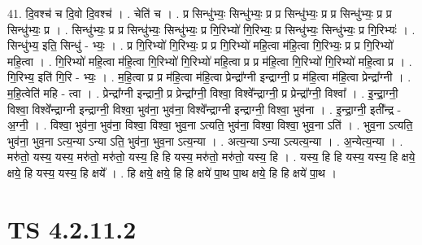 \documentclass[17pt]{extarticle}
\begin{document}
41. दि॒वश्च॑ च दि॒वो दि॒वश्च॑ । . चेति॑ च । . प्र सिन्धु॑भ्यः॒ सिन्धु॑भ्यः॒ प्र प्र सिन्धु॑भ्यः॒ प्र प्र सिन्धु॑भ्यः॒ प्र प्र सिन्धु॑भ्यः॒ प्र । . सिन्धु॑भ्यः॒ प्र प्र सिन्धु॑भ्यः॒ सिन्धु॑भ्यः॒ प्र गि॒रिभ्यो॑ गि॒रिभ्यः॒ प्र सिन्धु॑भ्यः॒ सिन्धु॑भ्यः॒ प्र गि॒रिभ्यः॑ । . सिन्धु॑भ्य॒ इति॒ सिन्धु॑ - भ्यः॒ । . प्र गि॒रिभ्यो॑ गि॒रिभ्यः॒ प्र प्र गि॒रिभ्यो॑ महि॒त्वा म॑हि॒त्वा गि॒रिभ्यः॒ प्र प्र गि॒रिभ्यो॑ महि॒त्वा । . गि॒रिभ्यो॑ महि॒त्वा म॑हि॒त्वा गि॒रिभ्यो॑ गि॒रिभ्यो॑ महि॒त्वा प्र प्र म॑हि॒त्वा गि॒रिभ्यो॑ गि॒रिभ्यो॑ महि॒त्वा प्र । . गि॒रिभ्य॒ इति॑ गि॒रि - भ्यः॒ । . म॒हि॒त्वा प्र प्र म॑हि॒त्वा म॑हि॒त्वा प्रेन्द्रा᳚ग्नी इन्द्राग्नी॒ प्र म॑हि॒त्वा म॑हि॒त्वा प्रेन्द्रा᳚ग्नी । . म॒हि॒त्वेति॑ महि - त्वा । . प्रेन्द्रा᳚ग्नी इन्द्रानी॒ प्र प्रेन्द्रा᳚ग्नी॒ विश्वा॒ विश्वे᳚न्द्राग्नी॒ प्र प्रेन्द्रा᳚ग्नी॒ विश्वा᳚ । . इ॒न्द्रा॒ग्नी॒ विश्वा॒ विश्वे᳚न्द्राग्नी इन्द्राग्नी॒ विश्वा॒ भुव॑ना॒ भुव॑ना॒ विश्वे᳚न्द्राग्नी इन्द्राग्नी॒ विश्वा॒ भुव॑ना । . इ॒न्द्रा॒ग्नी॒ इती᳚न्द्र - अ॒ग्नी॒ । . विश्वा॒ भुव॑ना॒ भुव॑ना॒ विश्वा॒ विश्वा॒ भुव॒ना ऽत्यति॒ भुव॑ना॒ विश्वा॒ विश्वा॒ भुव॒ना ऽति॑ । . भुव॒ना ऽत्यति॒ भुव॑ना॒ भुव॒ना ऽत्य॒न्या ऽन्या ऽति॒ भुव॑ना॒ भुव॒ना ऽत्य॒न्या । . अत्य॒न्या ऽन्या ऽत्यत्य॒न्या । . अ॒न्येत्य॒न्या । . मरु॑तो॒ यस्य॒ यस्य॒ मरु॑तो॒ मरु॑तो॒ यस्य॒ हि हि यस्य॒ मरु॑तो॒ मरु॑तो॒ यस्य॒ हि । . यस्य॒ हि हि यस्य॒ यस्य॒ हि क्षये॒ क्षये॒ हि यस्य॒ यस्य॒ हि क्षये᳚ । . हि क्षये॒ क्षये॒ हि हि क्षये॑ पा॒थ पा॒थ क्षये॒ हि हि क्षये॑ पा॒थ । \newline
\pagebreak
{}

\section{ TS 4.2.11.2 }
\end{document}
